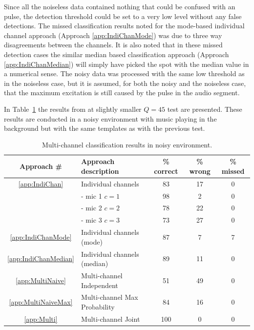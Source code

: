 Since all the noiseless data contained nothing that could be confused with an pulse, the detection threshold could be set to a very low level without any false detections. The missed classification results noted for the mode-based individual channel approach (Approach \ref{app:IndiChanMode}) was due to three way disagreements between the channels. It is also noted that in these missed detection cases the similar median based classification approach (Approach \ref{app:IndiChanMedian}) will simply have picked the spot with the median value in a numerical sense. The noisy data was processed with the same low threshold as in the noiseless case, but it is assumed, for both the noisy and the noiseless case, that the maximum excitation is still caused by the pulse in the audio segment.

In Table~\ref{tab:multiAPRresultsNoise} the results from at slightly smaller $Q=45$ test are presented. These results are conducted in a noisy environment with music playing in the background but with the same templates as with the previous test.

\begin{table}\begin{center}
\caption{Multi-channel classification results in noisy environment.}
\label{tab:multiAPRresultsNoise}
\begin{tabular}{|c|l|c|c|c|}\hline
Approach \#             & Approach description          & \% correct    & \% wrong  & \%  missed  \\ \hline
\ref{app:IndiChan}      & Individual channels           & 83            & 17        & 0           \\
                        &  - mic 1 $c = 1$              & 98            & 2         & 0           \\
                        &  - mic 2 $c = 2$              & 78            & 22        & 0           \\
                        &  - mic 3 $c = 3$              & 73            & 27        & 0           \\
\ref{app:IndiChanMode}  & Individual channels (mode)    & 87            & 7         & 7           \\
\ref{app:IndiChanMedian}& Individual channels (median)  & 89            & 11        & 0           \\
\ref{app:MultiNaive}    & Multi-channel Independent     & 51            & 49        & 0           \\
\ref{app:MultiNaiveMax} & Multi-channel Max Probability & 84            & 16        & 0           \\
\ref{app:Multi}         & Multi-channel Joint           & 100           & 0         & 0           \\ \hline
\end{tabular}\end{center}\end{table}


